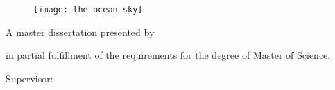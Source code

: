 %
%
% 
%

\thispagestyle{empty}
\addtocounter{page}{-1}

\begin{center}
  \LARGE {\semibold \myProject}

  \vfill

  \begin{figure}[h]
    \centering
    \texttt{[image: the-ocean-sky]}
  \end{figure}

  \vfill
  \large A master dissertation presented by
  \vspace{5mm}

  {\semibold \myName}

  \vspace{5mm}

  in partial fulfillment of the requirements for the degree of Master of
  Science.

  \vfill

  Supervisor: \mySupervisor

  \vfill
  \myDept \\
  \myUni \\
  \myDate
\end{center}
\skiponepage

